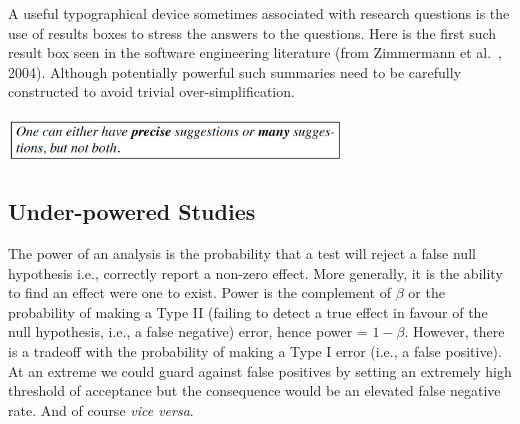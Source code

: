 \documentclass[preprint,10pt]{elsarticle}
\newcommand{\RED}{\color{red}}
\newcommand{\BLACK}{\color{black}}
\begin{document}

A useful typographical device sometimes associated with research questions is the use of results boxes to stress the answers to the questions. Here is the first such result box seen in the software engineering literature (from Zimmermann et al.~\cite{Zimmermann04}, 2004). Although potentially powerful such summaries need to be carefully constructed to avoid trivial over-simplification.

\centerline{\includegraphics[width=3.5in]{fig/resultbox.png}}



\subsection{Under-powered Studies}

The power of an analysis is the probability that a test will reject a false null hypothesis i.e., correctly report a non-zero effect. \RED More generally, it is the ability to find an effect were one to exist.  Power \BLACK is the complement of $\beta$ or the probability of making a Type II (failing to detect a true effect in favour of the null hypothesis, i.e., a false negative) error, hence power = $1 - \beta$.  
\RED However, there is a tradeoff with the probability of making a Type I error (i.e., a false positive).  At an extreme we could guard against false positives by setting an extremely high threshold of acceptance but the consequence would be an elevated false negative rate.  And of course \textit{vice versa}. \BLACK
\end{document}
